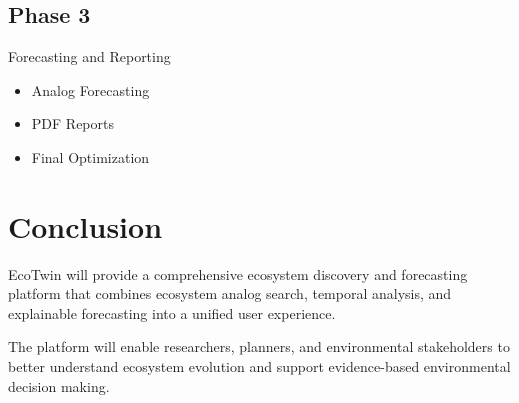 \documentclass[11pt,a4paper]{article}
\begin{document}
\subsection{Phase 3}

Forecasting and Reporting

\begin{itemize}
\item Analog Forecasting
\item PDF Reports
\item Final Optimization
\end{itemize}

\section{Conclusion}

EcoTwin will provide a comprehensive ecosystem discovery and forecasting platform that combines ecosystem analog search, temporal analysis, and explainable forecasting into a unified user experience.

The platform will enable researchers, planners, and environmental stakeholders to better understand ecosystem evolution and support evidence-based environmental decision making.
\end{document}
